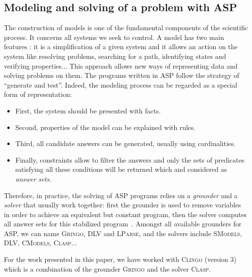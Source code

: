 \subsection*{Modeling and solving of a problem with ASP}

The construction of models is one of the fundamental components of the scientific process.
It concerns all systems we seek to control.
A model has two main features \cite{Glimpse}:
it is a simplification of a given system
and it allows an action on the system like resolving problems, searching for a path, identifying states and verifying properties...
This approach allows new ways of representing data and solving problems on them.
The programs written in ASP follow the strategy of ``generate and test''.
Indeed, the modeling process can be regarded as a special form of representation:
\begin{itemize}
  \item First, the system should be presented with facts.
  \item Second, properties of the model can be explained with rules.
  \item Third, all candidate answers can be generated, usually using cardinalities.
  \item Finally, constraints allow to filter the answers and only the sets of predicates satisfying all these conditions will be returned which and considered as \emph{answer sets}.
\end{itemize}

Therefore, in practice, the solving of ASP programs relies on a \emph{grounder} and a \emph{solver}
that usually work together:
first the grounder is used to remove variables in order to achieve an equivalent but constant program,
then the solver computes all answer sets for this stabilized program~\cite{Vladimir,AnsPrologAPE}.
Amongst all available grounders for ASP, we can name
\textsc{Gringo}, \textsc{DLV} and \textsc{LParse},
and the solvers include
\textsc{SModels}, \textsc{DLV}, \textsc{CModels}, \textsc{Clasp}...

For the work presented in this paper, we have worked with \textsc{Clingo} (version 3) which is a combination of the grounder \textsc{Gringo} and the solver \textsc{Clasp}.

